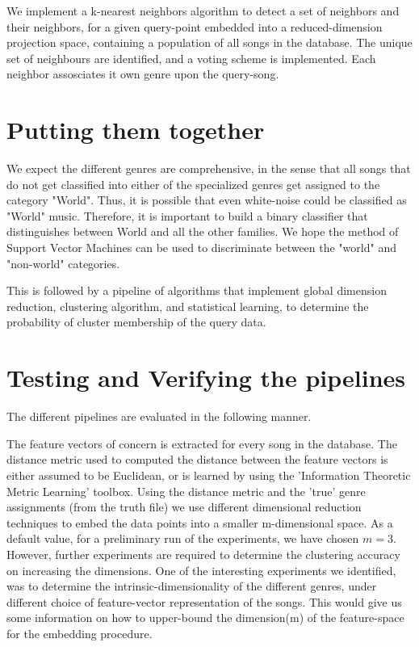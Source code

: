 \documentclass[12pt]{article}
\begin{document}
We implement a k-nearest neighbors algorithm to detect a set of neighbors and their neighbors, for a given query-point embedded into a reduced-dimension projection space, containing a population of all songs in the database. The unique set of neighbours are identified, and a voting scheme is implemented. Each neighbor assosciates it own genre upon the query-song. 

\section{Putting them together}

We expect the different genres are comprehensive, in the sense that all songs that do not get classified into either of the specialized genres get assigned to the category "World". Thus, it is possible that even white-noise could be classified as "World" music. Therefore, it is important to build a binary classifier that distinguishes between World and all the other families. We hope the method of Support Vector Machines can be used to discriminate between the "world" and "non-world" categories. 

This is followed by a pipeline of algorithms that implement global dimension reduction, clustering algorithm, and statistical learning, to determine the probability of cluster membership of the query data. 

\section{Testing and Verifying the pipelines}

The different pipelines are evaluated in the following manner. 

The feature vectors of concern is extracted for every song in the database. The distance metric used to computed the distance between the feature vectors is either assumed to be Euclidean, or is learned by using the 'Information Theoretic Metric Learning' \cite{infoTheoryMetricLearning} toolbox. Using the distance metric and the 'true' genre assignments (from the truth file) we use different dimensional reduction techniques to embed the data points into a smaller m-dimensional space. As a default value, for a preliminary run of the experiments, we have chosen $m = 3$. However, further experiments are required to determine the clustering accuracy on increasing the dimensions. One of the interesting experiments we identified, was to determine the intrinsic-dimensionality of the different genres, under different choice of feature-vector representation of the songs. This would give us some information on how to upper-bound the dimension(m) of the feature-space for the embedding procedure.
\end{document}
